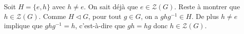 Soit $H=\{e,h\}$ avec $h\neq e$. On sait déjà que $e\in\mathcal{Z}(G)$. Reste à
montrer que $h\in\mathcal{Z}(G)$. Comme $H\lhd G$, pour tout $g\in G$, on a
$ghg^{-1}\in H$. De plus $h\neq e$ implique que  $ghg^{-1}=h$, c'est-à-dire que
$gh=hg$ donc $h\in\mathcal{Z}(G)$.

